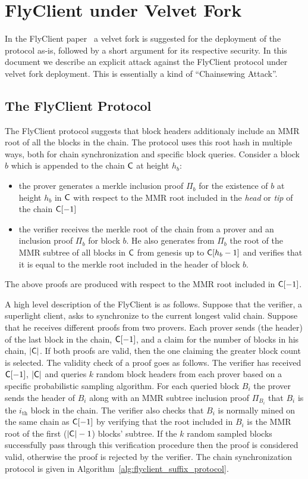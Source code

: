 \section{FlyClient under Velvet Fork}
\label{sec:flyclient}
In the FlyClient paper~\cite{flyclient} a velvet fork is suggested for the deployment of the protocol as-is, 
followed by a short argument for its respective security. In this document we describe an explicit attack against 
the FlyClient protocol under velvet fork deployment. 
This is essentially a kind of ``Chainsewing Attack''.

\subsection{The FlyClient Protocol}
	The FlyClient protocol suggests that block headers additionaly include an MMR root of all the blocks in the chain. The protocol uses this root hash in multiple ways, both for chain synchronization and specific block queries. Consider a block $b$ which is appended to the chain $\mathsf{C}$ at height $h_b$: 
	\begin{itemize}
		\item the prover generates a merkle inclusion proof $\Pi_b$ for the existence of $b$ at height $h_b$ in $\mathsf{C}$ with respect to the MMR root included in the \emph{head} or \emph{tip} of the chain $\mathsf{C}[-1]$
		\item the verifier receives the merkle root of the chain from a prover and an inclusion proof $\Pi_b$ for block $b$. He also generates from $\Pi_b$ the root of the MMR subtree of all blocks in $\mathsf{C}$ from genesis up to $\mathsf{C}[h_b - 1]$ and verifies that it is equal to the merkle root included in the header of block $b$.
	\end{itemize}
	The above proofs are produced with respect to the MMR root included in $\mathsf{C}[-1]$.

	\vspace{2mm}
	\noindent
	A high level description of the FlyClient is as follows. Suppose that  the verifier, a superlight client, asks to synchronize to the current longest valid chain.  Suppose that he receives different proofs from two provers. Each prover sends (the header) of the last block in the chain, $\mathsf{C}[-1]$, and a claim for the number of blocks in his chain, $\lvert \mathsf{C} \rvert$. If both proofs are valid, then the one claiming the greater block count is selected. The validity check of a proof goes as follows. 
	The verifier has received $\mathsf{C}[-1]$, $\lvert \mathsf{C} \rvert$ and queries $k$ random block headers from each prover based on a specific probabilistic sampling algorithm. For each queried block $B_i$ the prover sends the header of $B_i$ along with an MMR subtree inclusion proof $\Pi_{B_i}$ that $B_i$ is the $i_\text{th}$ block in the chain. The verifier also checks that $B_i$ is normally mined on the same chain as $\mathsf{C}[-1]$ by verifying that the root included in $B_i$ is the MMR root of the first ($\lvert \mathsf{C} \rvert - 1$) blocks' subtree. If the $k$ random sampled blocks successfully pass through this verification procedure then the proof is considered valid, otherwise the proof is rejected by the verifier. 
	The chain synchronization protocol is given in Algorithm~\ref{alg:flyclient_suffix_protocol}.

